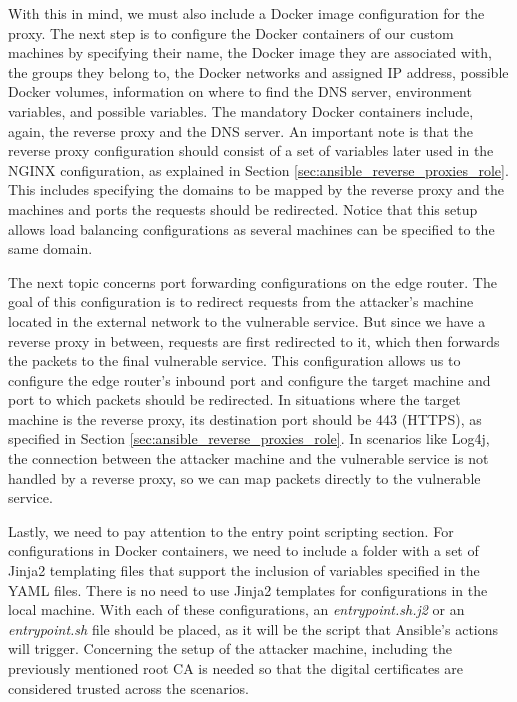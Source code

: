 With this in mind, we must also include a Docker image configuration for the proxy. The next step is to configure the Docker containers of our custom machines by specifying their name, the Docker image they are associated with, the groups they belong to, the Docker networks and assigned IP address, possible Docker volumes, information on where to find the DNS server, environment variables, and possible variables. The mandatory Docker containers include, again, the reverse proxy and the DNS server. An important note is that the reverse proxy configuration should consist of a set of variables later used in the NGINX configuration, as explained in Section \ref{sec:ansible_reverse_proxies_role}. This includes specifying the domains to be mapped by the reverse proxy and the machines and ports the requests should be redirected. Notice that this setup allows load balancing configurations as several machines can be specified to the same domain. 

The next topic concerns port forwarding configurations on the edge router. The goal of this configuration is to redirect requests from the attacker's machine located in the external network to the vulnerable service. But since we have a reverse proxy in between, requests are first redirected to it, which then forwards the packets to the final vulnerable service. This configuration allows us to configure the edge router's inbound port and configure the target machine and port to which packets should be redirected. In situations where the target machine is the reverse proxy, its destination port should be 443 (HTTPS), as specified in Section \ref{sec:ansible_reverse_proxies_role}. In scenarios like Log4j, the connection between the attacker machine and the vulnerable service is not handled by a reverse proxy, so we can map packets directly to the vulnerable service.

Lastly, we need to pay attention to the entry point scripting section. For configurations in Docker containers, we need to include a folder with a set of Jinja2 templating files that support the inclusion of variables specified in the YAML files. There is no need to use Jinja2 templates for configurations in the local machine. With each of these configurations, an \textit{entrypoint.sh.j2} or an \textit{entrypoint.sh} file should be placed, as it will be the script that Ansible's actions will trigger. Concerning the setup of the attacker machine, including the previously mentioned root CA is needed so that the digital certificates are considered trusted across the scenarios.


